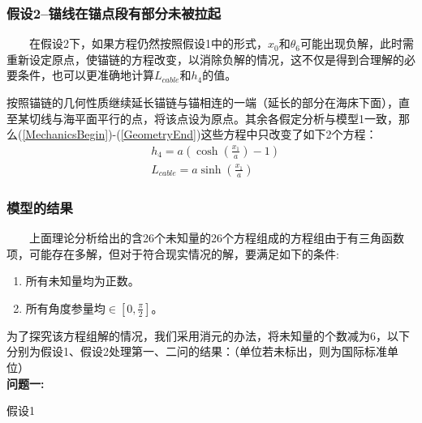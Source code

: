 \documentclass[a4paper,12pt]{ctexart}
\begin{document}
\subsubsection{假设2--锚线在锚点段有部分未被拉起}

~~~~在假设2下，如果方程仍然按照假设1中的形式，$x_0$和$\theta_6$可能出现负解，此时需重新设定原点，使锚链的方程改变，以消除负解的情况，这不仅是得到合理解的必要条件，也可以更准确地计算$L_{cable}$和$h_4$的值。

按照锚链的几何性质继续延长锚链与锚相连的一端（延长的部分在海床下面），直至某切线与海平面平行的点，将该点设为原点。其余各假定分析与模型1一致，那么(\ref{MechanicsBegin})-(\ref{GeometryEnd})这些方程中只改变了如下2个方程：\\
\begin{align}
&h_4=a(\cosh(\frac{x_1}{a})-1)\\
&L_{cable}=a\sinh(\frac{x_1}{a})
\end{align}

\subsubsection{模型的结果}

~~~~上面理论分析给出的含26个未知量的26个方程组成的方程组由于有三角函数项，可能存在多解，但对于符合现实情况的解，要满足如下的条件:

\begin{enumerate}
\item 所有未知量均为正数。
\item 所有角度参量均$\in[0,\frac{\pi}{2}]$。
\end{enumerate}

为了探究该方程组解的情况，我们采用消元的办法，将未知量的个数减为6，以下分别为假设1、假设2处理第一、二问的结果：（单位若未标出，则为国际标准单位）\\

\noindent \textbf{问题一:}

假设1
\end{document}
